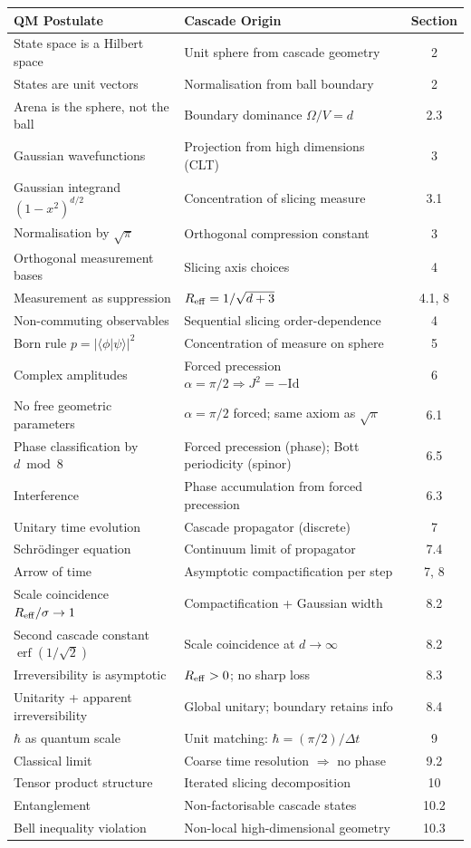 \documentclass[12pt,a4paper]{article}
\begin{document}
\begin{center}
\begin{tabular}{p{5.5cm}p{5cm}c}
\toprule
QM Postulate & Cascade Origin & Section \\
\midrule
State space is a Hilbert space & Unit sphere from cascade geometry & 2 \\
States are unit vectors & Normalisation from ball boundary & 2 \\
Arena is the sphere, not the ball & Boundary dominance $\Omega/V=d$ & 2.3 \\
Gaussian wavefunctions & Projection from high dimensions (CLT) & 3 \\
Gaussian integrand $(1-x^2)^{d/2}$ & Concentration of slicing measure & 3.1 \\
Normalisation by $\sqrt{\pi}$ & Orthogonal compression constant & 3 \\
Orthogonal measurement bases & Slicing axis choices & 4 \\
Measurement as suppression & $R_{\rm eff}=1/\sqrt{d+3}$ & 4.1, 8 \\
Non-commuting observables & Sequential slicing order-dependence & 4 \\
Born rule $p=|\langle\phi|\psi\rangle|^2$ & Concentration of measure on sphere & 5 \\
Complex amplitudes & Forced precession $\alpha=\pi/2\Rightarrow J^2=-\mathrm{Id}$ & 6 \\
No free geometric parameters & $\alpha=\pi/2$ forced; same axiom as $\sqrt{\pi}$ & 6.1 \\
Phase classification by $d\bmod 8$ & Forced precession (phase); Bott periodicity (spinor) & 6.5 \\
Interference & Phase accumulation from forced precession & 6.3 \\
Unitary time evolution & Cascade propagator (discrete) & 7 \\
Schr\"{o}dinger equation & Continuum limit of propagator & 7.4 \\
Arrow of time & Asymptotic compactification per step & 7, 8 \\
Scale coincidence $R_{\rm eff}/\sigma\to 1$ & Compactification + Gaussian width & 8.2 \\
Second cascade constant $\operatorname{erf}(1/\sqrt{2})$ & Scale coincidence at $d\to\infty$ & 8.2 \\
Irreversibility is asymptotic & $R_{\rm eff}>0$; no sharp loss & 8.3 \\
Unitarity + apparent irreversibility & Global unitary; boundary retains info & 8.4 \\
$\hbar$ as quantum scale & Unit matching: $\hbar=(\pi/2)/\Delta t$ & 9 \\
Classical limit & Coarse time resolution $\Rightarrow$ no phase & 9.2 \\
Tensor product structure & Iterated slicing decomposition & 10 \\
Entanglement & Non-factorisable cascade states & 10.2 \\
Bell inequality violation & Non-local high-dimensional geometry & 10.3 \\
\bottomrule
\end{tabular}
\end{center}
\end{document}
